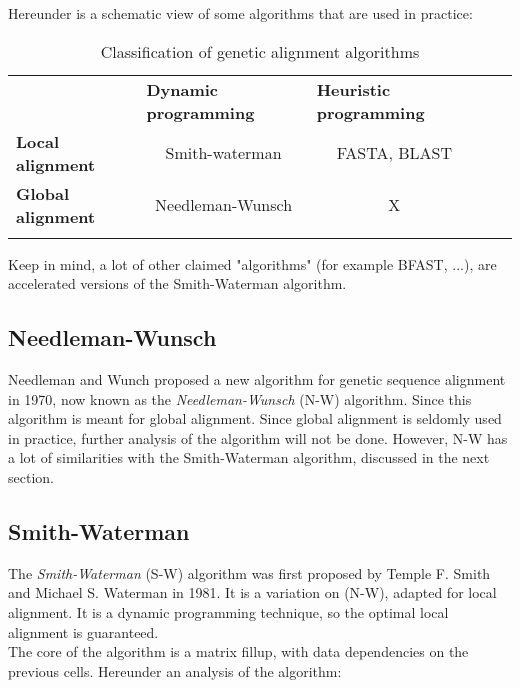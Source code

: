 Hereunder is a schematic view of some algorithms that are used in practice:

\begin{table}[H]
	\begin{tabular}{lllll}
		\cline{1-3}
		\multicolumn{1}{|l|}{}                          & \multicolumn{1}{l|}{\textbf{Dynamic programming}} & \multicolumn{1}{l|}{\textbf{Heuristic programming}} &  &  \\ \cline{1-3}
		\multicolumn{1}{|l|}{\textbf{Local alignment}}  & \multicolumn{1}{c|}{Smith-waterman}               & \multicolumn{1}{c|}{FASTA, BLAST}                   &  &  \\ \cline{1-3}
		\multicolumn{1}{|l|}{\textbf{Global alignment}} & \multicolumn{1}{c|}{Needleman-Wunsch}             & \multicolumn{1}{c|}{X}                              &  &  \\ \cline{1-3}
		&                                                   &                                                     &  & 
	\end{tabular}
	\caption{Classification of genetic alignment algorithms}
\end{table}


Keep in mind, a lot of other claimed "algorithms" (for example BFAST, ...), are accelerated versions of the Smith-Waterman algorithm.

\subsection{Needleman-Wunsch}
Needleman and Wunch proposed a new algorithm for genetic sequence alignment in 1970, now known as the \emph{Needleman-Wunsch} (N-W) algorithm. Since this algorithm is meant for global alignment. Since global alignment is seldomly used in practice, further analysis of the algorithm will not be done. However, N-W has a lot of similarities with the Smith-Waterman algorithm, discussed in the next section.

\subsection{Smith-Waterman}
\label{expl:SWanalyse}
The \emph{Smith-Waterman} (S-W) algorithm was first proposed by Temple F. Smith and Michael S. Waterman in 1981. It is a variation on (N-W), adapted for local alignment. It is a dynamic programming technique, so the optimal local alignment is guaranteed. \\

The core of the algorithm is a matrix fillup, with data dependencies on the previous cells. Hereunder an analysis of the algorithm:

